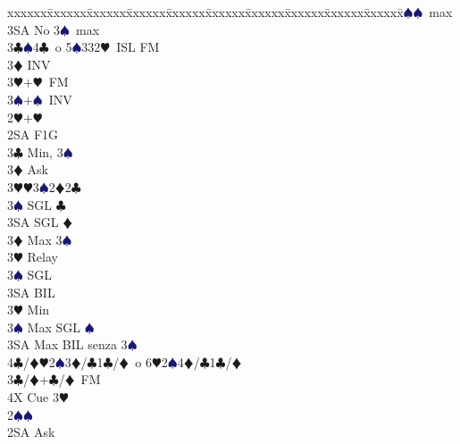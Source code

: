 \documentclass[a4paper,italian]{article}
\newcommand{\BC}{\textcolor{OliveGreen}{$\clubsuit$}}
\newcommand{\BD}{\textcolor{RedOrange}{$\vardiamondsuit$}}
\newcommand{\BH}{\textcolor{Red2}{$\varheartsuit${}}}
\newcommand{\BS}{\textcolor{MidnightBlue}{$\spadesuit${}}}
\newenvironment{bidtable}
{\begin{tabbing}

    xxxxxx\=xxxxxx\=xxxxxx\=xxxxxx\=xxxxxx\=xxxxxx\=xxxxxx\=xxxxxx\=xxxxxx\=xxxxxx\=\kill}
{\end{tabbing} }%
\begin{document}
\begin{multicols*}{2}
\begin{bidtable}
                                            3\BS {}\BS\ max\\
                                            3SA \> No 3\BS\ max\-\\
                                            3\BC {}\BS 4\BC\ o 5\BS 332\BH\ ISL FM\\
                                            3\BD \> INV\\
                                            3\BH {}+\BH\ FM\\
                                            3\BS {}+\BS\ INV\-\\
                                            2\BH {}+\BH \+\\
                                            2SA \> F1G\+\\
                                            3\BC \> Min, 3\BS\+\\
                                            3\BD \> Ask\+\\
                                            3\BH {}\BH3\BS2\BD2\BC\\
                                            3\BS \> SGL \BC\\
                                            3SA \> SGL \BD\-\-\\
                                            3\BD \> Max 3\BS\+\\
                                            3\BH \> Relay \+\\
                                            3\BS \> SGL\\
                                            3SA \> BIL\-\-\\
                                            3\BH \> Min\\
                                            3\BS \> Max SGL \BS \\
                                            3SA \> Max BIL senza 3\BS\\
                                            4\BC/\BD {}\BH2\BS3\BD/\BC1\BC/\BD\ o 6\BH2\BS4\BD/\BC1\BC/\BD\-\\
                                            3\BC/\BD {}+\BC /\BD\ FM\\
                                            4X \> Cue 3\BH \-\\
                                            2\BS {}\BS \+\\
                                            2SA \> Ask\+\\

\end{bidtable}
\end{multicols*}
\end{document}
